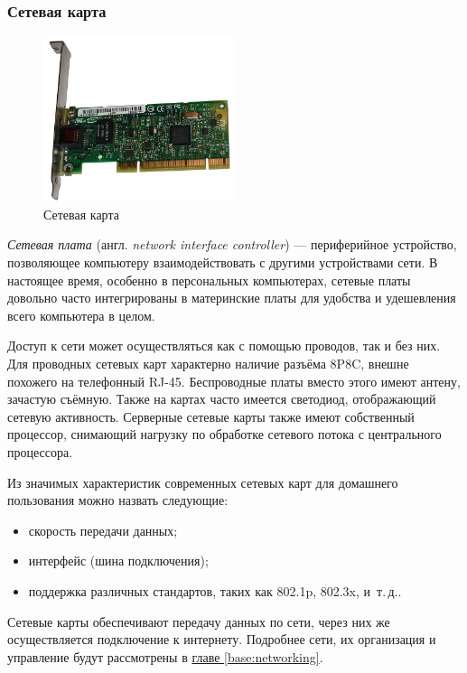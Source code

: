 \subsubsection{Сетевая карта}\label{base:introduction:components:nic}
\begin{figure}[h!]
 \centering
 \includegraphics[width=0.5\textwidth]{base/Introduction/NIC.jpg}
 \caption{Сетевая карта}
 \label{base:introduction:components:nic:nicpic}
\end{figure}
\emph{Сетевая плата} (англ. \emph{network interface controller}) --- периферийное устройство, позволяющее компьютеру взаимодействовать с другими устройствами сети.
В настоящее время, особенно в персональных компьютерах, сетевые платы довольно часто интегрированы в материнские платы для удобства и удешевления всего компьютера в целом.

Доступ к сети может осуществляться как с помощью проводов, так и без них.
Для проводных сетевых карт характерно наличие разъёма 8P8C, внешне похожего на телефонный RJ-45.
Беспроводные платы вместо этого имеют антену, зачастую съёмную. Также на картах часто имеется светодиод, отображающий сетевую активность.
Серверные сетевые карты также имеют собственный процессор, снимающий нагрузку по обработке сетевого потока с центрального процессора.

Из значимых характеристик современных сетевых карт для домашнего пользования можно назвать следующие:
\begin{itemize}
 \item скорость передачи данных;
 \item интерфейс (шина подключения);
 \item поддержка различных стандартов, таких как 802.1p, 802.3x, и~т.\,д..
\end{itemize}

Сетевые карты обеспечивают передачу данных по сети, через них же осуществляется подключение к интернету. Подробнее сети, их организация и управление будут рассмотрены в \hyperref[base:networking]{главе \ref*{base:networking}}.

